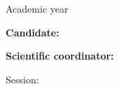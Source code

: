 \begin{titlepage}
\thispagestyle{titlepagestyle}
    \begin{center}
        \textbf{\fontsize{14pt}{18pt} \selectfont \university} \\[6pt]
        \fontsize{12pt}{16pt} \selectfont \studyProgram \\[4pt]
        \fontsize{12pt}{16pt} \selectfont Academic year \academicYear
    \end{center}

    \begin{center}
        \vspace*{\fill}
        \textbf{\fontsize{20pt}{30pt} \selectfont \MakeUppercase{\thesisTitle}}
    \end{center}
    
    \vspace*{\fill}
     
            
    \textbf{\fontsize{14pt}{16pt} \selectfont Candidate: \candidateName}
    
    \vspace{14pt}
    
    \textbf{\fontsize{14pt}{16pt} \selectfont Scientific coordinator: \coordinator}

    \begin{center}
        \vspace{50pt}
        \fontsize{14pt}{16pt} \selectfont Session: \monthOfPresentation{} \academicYear 
    \end{center}
    

\end{titlepage}